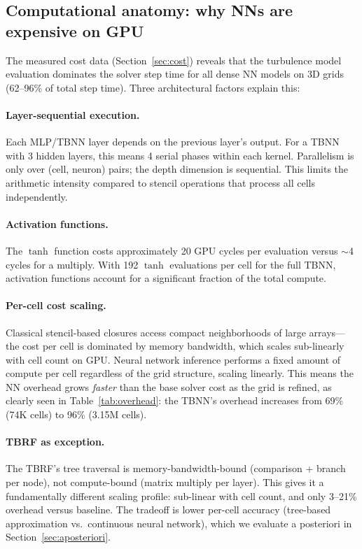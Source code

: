 \subsection{Computational anatomy: why NNs are expensive on GPU}
\label{sec:comp_anatomy}

The measured cost data (Section~\ref{sec:cost}) reveals that the turbulence model evaluation dominates the solver step time for all dense NN models on 3D grids (62--96\% of total step time).
Three architectural factors explain this:

\paragraph{Layer-sequential execution.}
Each MLP/TBNN layer depends on the previous layer's output.
For a TBNN with 3 hidden layers, this means 4 serial phases within each kernel.
Parallelism is only over (cell, neuron) pairs; the depth dimension is sequential.
This limits the arithmetic intensity compared to stencil operations that process all cells independently.

\paragraph{Activation functions.}
The $\tanh$ function costs approximately 20 GPU cycles per evaluation versus $\sim$4 cycles for a multiply.
With 192 $\tanh$ evaluations per cell for the full TBNN, activation functions account for a significant fraction of the total compute.

\paragraph{Per-cell cost scaling.}
Classical stencil-based closures access compact neighborhoods of large arrays---the cost per cell is dominated by memory bandwidth, which scales sub-linearly with cell count on GPU.
Neural network inference performs a fixed amount of compute per cell regardless of the grid structure, scaling linearly.
This means the NN overhead grows \emph{faster} than the base solver cost as the grid is refined, as clearly seen in Table~\ref{tab:overhead}: the TBNN's overhead increases from 69\% (74K cells) to 96\% (3.15M cells).

\paragraph{TBRF as exception.}
The TBRF's tree traversal is memory-bandwidth-bound (comparison + branch per node), not compute-bound (matrix multiply per layer).
This gives it a fundamentally different scaling profile: sub-linear with cell count, and only 3--21\% overhead versus baseline.
The tradeoff is lower per-cell accuracy (tree-based approximation vs.\ continuous neural network), which we evaluate a posteriori in Section~\ref{sec:aposteriori}.

